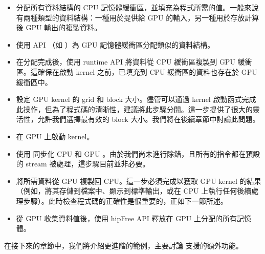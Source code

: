 \begin{itemize}
    \item 分配所有資料結構的 CPU 記憶體緩衝區，並填充為程式所需的值。一般來說有兩種類型的資料結構：一種用於提供給 GPU 的輸入，另一種用於存放計算後 GPU 輸出的複製資料。
    \item 使用  API （如 ）為 GPU 記憶體緩衝區分配類似的資料結構。
    \item 在分配完成後，使用  runtime API 將資料從 CPU 緩衝區複製到 GPU 緩衝區。這確保在啟動 kernel 之前，已填充到 CPU 緩衝區的資料也存在於 GPU 緩衝區中。
    \item 設定 GPU kernel 的 grid 和 block 大小。儘管可以通過 kernel 啟動函式完成此操作，但為了程式碼的清晰性，建議將此步驟分開。這一步提供了很大的靈活性，允許我們選擇最有效的 block 大小。我們將在後續章節中討論此問題。
    \item 在 GPU 上啟動 kernel。
    \item 使用  同步化 CPU 和 GPU 。由於我們尚未進行除錯，且所有的指令都在預設的 stream 被處理，這步驟目前並非必要。
    \item 將所需資料從 GPU 複製回 CPU。這一步必須完成以獲取 GPU kernel 的結果（例如，將其存儲到檔案中、顯示到標準輸出，或在 CPU 上執行任何後續處理步驟）。此時檢查程式碼的正確性是很重要的，正如下一節所述。
    \item 從 GPU 收集資料值後，使用 hipFree API 釋放在 GPU 上分配的所有記憶體。
\end{itemize}

在接下來的章節中，我們將介紹更進階的範例，主要討論  支援的額外功能。